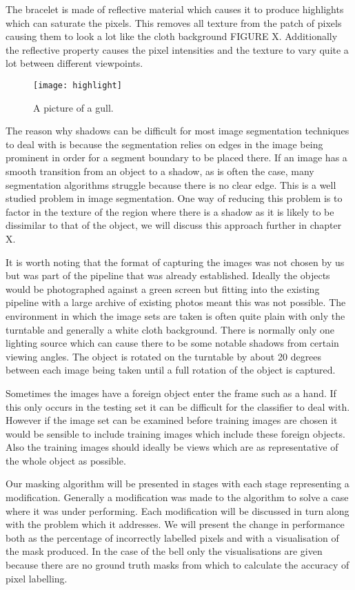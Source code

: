 \documentclass[12pt]{IIBproject}
\begin{document}
The bracelet is made of reflective material which causes it to produce highlights which can saturate the pixels. This removes all texture from the patch of pixels causing them to look a lot like the cloth background FIGURE X. Additionally the reflective property causes the pixel intensities and the texture to vary quite a lot between different viewpoints.
\begin{figure}[H]
  \caption{A picture of a gull.}
  \centering
    \texttt{[image: highlight]}
\end{figure}
The reason why shadows can be difficult for most image segmentation techniques to deal with is because the segmentation relies on edges in the image being prominent in order for a segment boundary to be placed there. If an image has a smooth transition from an object to a shadow, as is often the case, many segmentation algorithms struggle because there is no clear edge. This is a well studied problem in image segmentation\cite{ecins2014shadow}. One way of reducing this problem is to factor in the texture of the region where there is a shadow as it is likely to be dissimilar to that of the object, we will discuss this approach further in chapter X. 

It is worth noting that the format of capturing the images was not chosen by us but was part of the pipeline that was already established. Ideally the objects would be photographed against a green screen but fitting into the existing pipeline with a large archive of existing photos meant this was not possible. 
The environment in which the image sets are taken is often quite plain with only the turntable and generally a white cloth background. There is normally only one lighting source which can cause there to be some notable shadows from certain viewing angles. The object is rotated on the turntable by about 20 degrees between each image being taken until a full rotation of the object is captured. 

Sometimes the images have a foreign object enter the frame such as a hand. If this only occurs in the testing set it can be difficult for the classifier to deal with. However if the image set can be examined before training images are chosen it would be sensible to include training images which include these foreign objects. Also the training images should ideally be views which are as representative of the whole object as possible.

Our masking algorithm will be presented in stages with each stage representing a modification. Generally a modification was made to the algorithm to solve a case where it was under performing. Each modification will be discussed in turn along with the problem which it addresses. We will present the change in performance both as the percentage of incorrectly labelled pixels and with a visualisation of the mask produced. In the case of the bell only the visualisations are given because there are no ground truth masks from which to calculate the accuracy of pixel labelling.
\end{document}

